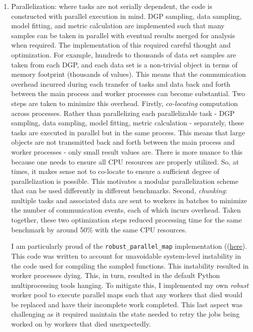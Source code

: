 \documentclass[./main.tex]{subfiles}
\begin{document}
\begin{enumerate}
    \item Parallelization: where tasks are not serially dependent, the code is constructed with parallel execution in mind. DGP sampling, data sampling, model fitting, and metric calculation are implemented such that many samples can be taken in parallel with eventual results merged for analysis when required. The implementation of this required careful thought and optimization. For example, hundreds to thousands of data set samples are taken from each DGP, and each data set is a non-trivial object in terms of memory footprint (thousands of values). This means that the communication overhead incurred during each transfer of tasks and data back and forth between the main process and worker processes can become substantial. Two steps are taken to minimize this overhead. Firstly, \textit{co-locating} computation across processes. Rather than parallelizing each parallelizable task - DGP sampling, data sampling, model fitting, metric calculation - separately, these tasks are executed in parallel but in the same process. This means that large objects are not transmitted back and forth between the main process and worker processes - only small result values are. There is more nuance to this because one needs to ensure all CPU resources are properly utilized. So, at times, it makes sense not to co-locate to ensure a sufficient degree of parallelization is possible. This motivates a modular parallelization scheme that can be used differently in different benchmarks. Second, \textit{chunking}: multiple tasks and associated data are sent to workers in batches to minimize the number of communication events, each of which incurs overhead. Taken together, these two optimization steps reduced processing time for the same benchmark by around 50\% with the same CPU resources.
    
    I am particularly proud of the \texttt{robust_parallel_map} implementation ((\href{https://github.com/JoshBroomberg/Maccabee/blob/master/Maccabee/maccabee/utilities/multiprocessing.py}{here}). This code was written to account for unavoidable system-level instability in the code used for compiling the sampled functions. This instability resulted in worker processes dying. This, in turn, resulted in the default Python multiprocessing tools hanging. To mitigate this, I implemented my own \textit{robust} worker pool to execute parallel maps such that any workers that died would be replaced and have their incomplete work completed. This last aspect was challenging as it required maintain the state needed to retry the jobs being worked on by workers that died unexpectedly.
\end{enumerate}
 
\end{document}
